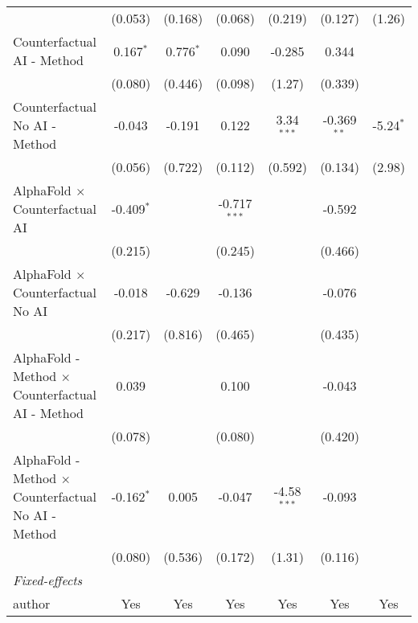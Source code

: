 \begin{tabular}{lcccccc}
                                                              & (0.053)      & (0.168)      & (0.068)        & (0.219)       & (0.127)       & (1.26)\\   
   Counterfactual AI - Method                                 & 0.167$^{*}$  & 0.776$^{*}$  & 0.090          & -0.285        & 0.344         &   \\   
                                                              & (0.080)      & (0.446)      & (0.098)        & (1.27)        & (0.339)       &   \\   
   Counterfactual No AI - Method                              & -0.043       & -0.191       & 0.122          & 3.34$^{***}$  & -0.369$^{**}$ & -5.24$^{*}$\\   
                                                              & (0.056)      & (0.722)      & (0.112)        & (0.592)       & (0.134)       & (2.98)\\   
   AlphaFold $\times$ Counterfactual AI                       & -0.409$^{*}$ &              & -0.717$^{***}$ &               & -0.592        &   \\   
                                                              & (0.215)      &              & (0.245)        &               & (0.466)       &   \\   
   AlphaFold $\times$ Counterfactual No AI                    & -0.018       & -0.629       & -0.136         &               & -0.076        &   \\   
                                                              & (0.217)      & (0.816)      & (0.465)        &               & (0.435)       &   \\   
   AlphaFold - Method $\times$ Counterfactual AI - Method     & 0.039        &              & 0.100          &               & -0.043        &   \\   
                                                              & (0.078)      &              & (0.080)        &               & (0.420)       &   \\   
   AlphaFold - Method $\times$ Counterfactual No AI - Method  & -0.162$^{*}$ & 0.005        & -0.047         & -4.58$^{***}$ & -0.093        &   \\   
                                                              & (0.080)      & (0.536)      & (0.172)        & (1.31)        & (0.116)       &   \\   
   \midrule
   \emph{Fixed-effects}\\
   author                                                     & Yes          & Yes          & Yes            & Yes           & Yes           & Yes\\  

\end{tabular}
